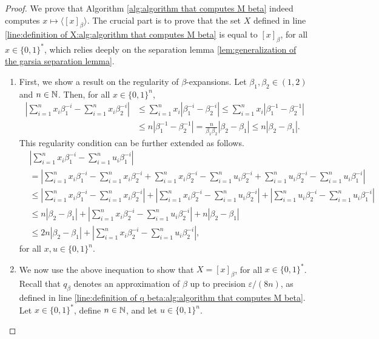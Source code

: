 \begin{proof}
        We prove that Algorithm \ref{alg:algorithm that computes M beta} indeed computes $x \mapsto \langle [x]_\beta \rangle$. The crucial part is to prove that the set $X$ defined in line \ref{line:definition of X:alg:algorithm that computes M beta} is equal to $[x]_\beta$, for all $x \in \{0,1\}^\ast$, which relies deeply on the separation lemma \ref{lem:generalization of the garsia separation lemma}.
        \begin{enumerate}[label=(\alph*)]
            \item First, we show a result on the regularity of $\beta$-expansions. Let $\beta_1,\beta_2 \in (1,2)$ and $n \in \mathbb{N}$. Then, for all $x \in \{0,1\}^n$,
            \begin{align}
                \left| \sum_{i=1}^n x_i \beta_1^{-i} - \sum_{i=1}^n x_i \beta_2^{-i}\right|& \leq  \sum_{i=1}^n x_i\left| \beta_1^{-i} - \beta_2^{-i}\right| \leq  \sum_{i=1}^n x_i\left| \beta_1^{-1} - \beta_2^{-1}\right|\\
                & \leq n \left| \beta_1^{-1} - \beta_2^{-1}\right| = \frac{n}{\beta_1\beta_2} \left| \beta_2 - \beta_1\right| \leq n \left| \beta_2 - \beta_1\right|.
            \end{align}
            This regularity condition can be further extended as follows.
            \begin{align}
                &\left| \sum_{i=1}^n x_i \beta_1^{-i} - \sum_{i=1}^n u_i \beta_1^{-i} \right| \\
                &= \left| \sum_{i=1}^n x_i \beta_1^{-i} - \sum_{i=1}^n x_i \beta_2^{-i} + \sum_{i=1}^n x_i \beta_2^{-i} - \sum_{i=1}^n u_i \beta_2^{-i} + \sum_{i=1}^n u_i \beta_2^{-i} - \sum_{i=1}^n u_i \beta_1^{-i} \right|\\
                &\leq \left| \sum_{i=1}^n x_i \beta_1^{-i} - \sum_{i=1}^n x_i \beta_2^{-i}\right| +  \left|\sum_{i=1}^n x_i \beta_2^{-i} - \sum_{i=1}^n u_i \beta_2^{-i}\right| +  \left|\sum_{i=1}^n u_i \beta_2^{-i} - \sum_{i=1}^n u_i \beta_1^{-i} \right|\\
                &\leq n |\beta_2 - \beta_1| + \left|\sum_{i=1}^n x_i \beta_2^{-i} - \sum_{i=1}^n u_i \beta_2^{-i}\right| + n |\beta_2 - \beta_1|\\
                &\leq 2n |\beta_2 - \beta_1| + \left|\sum_{i=1}^n x_i \beta_2^{-i} - \sum_{i=1}^n u_i \beta_2^{-i}\right|, \label{eq:bounding the error with q beta by the error with beta}
            \end{align}
            for all $x,u \in \{0,1\}^n$.
            \item We now use the above inequation to show that $X = [x]_\beta$, for all $x \in \{0,1\}^\ast$. Recall that $q_\beta$ denotes an approximation of $\beta$ up to precision $\varepsilon/(8n)$, as defined in line \ref{line:definition of q beta:alg:algorithm that computes M beta}. Let $x \in \{0,1\}^\ast$, define $n \in \mathbb{N}$, and let $u \in \{0,1\}^n$.

\end{enumerate}
\end{proof}
